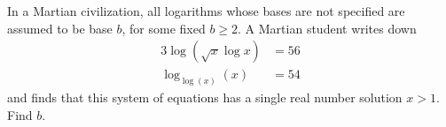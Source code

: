 In a Martian civilization, all logarithms whose bases are not specified are assumed to be base $b$, for some fixed $b \geq 2$. A Martian student writes down
\begin{align*}3 \log(\sqrt{x}\log x) &= 56\\\log_{\log (x)}(x) &= 54
\end{align*}
and finds that this system of equations has a single real number solution $x > 1$. Find $b$.